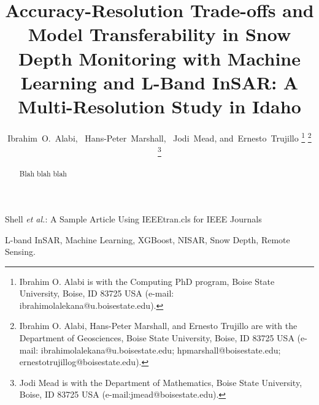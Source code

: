 \documentclass[lettersize,journal]{IEEEtran}
\begin{document}

\title{Accuracy-Resolution Trade-offs and Model Transferability in Snow Depth Monitoring with Machine Learning and L-Band InSAR: A Multi-Resolution Study in Idaho}


\author{Ibrahim~O.~Alabi,~
Hans-Peter~Marshall,~
Jodi~Mead,
and~Ernesto~Trujillo%
\thanks{Ibrahim O. Alabi is with the Computing PhD program, Boise
State University, Boise, ID 83725 USA (e-mail: ibrahimolalekana@u.boisestate.edu).}%
\thanks{Ibrahim O. Alabi, Hans-Peter Marshall, and Ernesto Trujillo are with the Department of Geosciences, Boise
State University, Boise, ID 83725 USA (e-mail: ibrahimolalekana@u.boisestate.edu;
hpmarshall@boisestate.edu; ernestotrujillog@boisestate.edu).}
\thanks{Jodi Mead is with the Department of Mathematics, Boise State University, Boise, ID 83725 USA (e-mail:jmead@boisestate.edu).}}


%
{Shell \MakeLowercase{\textit{et al.}}: A Sample Article Using IEEEtran.cls for IEEE Journals}


\maketitle

\begin{abstract}
Blah blah blah
\end{abstract}

\begin{IEEEkeywords}
  L-band InSAR, Machine Learning, XGBoost, NISAR, Snow Depth, Remote Sensing.
\end{IEEEkeywords}
\end{document}
